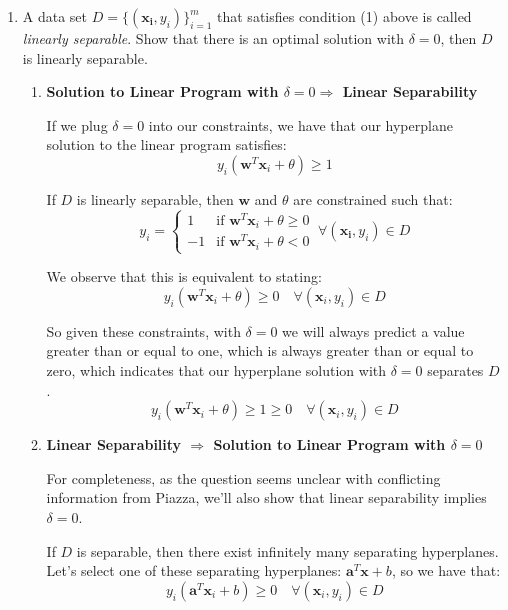 \documentclass[11pt]{article}
\newenvironment{solution}{\color{blue}{\bf Solution:}}{}
\begin{document}
\begin{enumerate}
  \item A data set \(D = \{(\mathbf{x_i}, y_i)\}_{i=1}^m\) that satisfies
    condition (1) above is called \textit{linearly separable}. Show that there
    is an optimal solution with $\delta = 0$, then $D$ is linearly separable.

  \begin{solution}
  \begin{enumerate}
    \item \textbf{Solution to Linear Program with $\delta = 0 \Rightarrow$ Linear Separability}

    If we plug $\delta = 0$ into our constraints, we have that our hyperplane
    solution to the linear program satisfies:
    \[
      y_i(\mathbf{w}^T\mathbf{x}_i + \theta) \geq 1
    \]

    If $D$ is linearly separable, then $\mathbf{w}$ and $\theta$ are constrained
    such that:
    \[
      y_i =
      \begin{cases}
        1  & \text{if } \mathbf{w}^T \mathbf{x}_i + \theta \geq 0\\
        -1 & \text{if } \mathbf{w}^T \mathbf{x}_i + \theta < 0
      \end{cases}
      \ \forall (\mathbf{x_i}, y_i) \in D
    \]

    We observe that this is equivalent to stating:
    \[
      y_i(\mathbf{w}^T\mathbf{x}_i + \theta) \geq 0 \quad\forall(\mathbf{x}_i, y_i) \in D
    \]

    So given these constraints, with $\delta = 0$ we will always predict a value
    greater than or equal to one, which is always greater than or equal to zero,
    which indicates that our hyperplane solution with $\delta = 0$ separates $D$.
    \[
      y_i(\mathbf{w}^T\mathbf{x}_i + \theta) \geq 1 \geq 0\quad\forall(\mathbf{x}_i, y_i) \in D
    \]

    \item \textbf{Linear Separability $\Rightarrow$ Solution to Linear Program with $\delta=0$}

    For completeness, as the question seems unclear with conflicting information
    from Piazza, we'll also show that linear separability implies $\delta = 0$.

    If $D$ is separable, then there exist infinitely many separating
    hyperplanes. Let's select one of these separating hyperplanes:
    $\mathbf{a}^T \mathbf{x} + b$, so we have that:
    \[
      y_i(\mathbf{a}^T\mathbf{x}_i + b) \geq 0 \quad\forall(\mathbf{x}_i, y_i) \in D
    \]


\end{enumerate}
\end{solution}
\end{enumerate}
\end{document}
